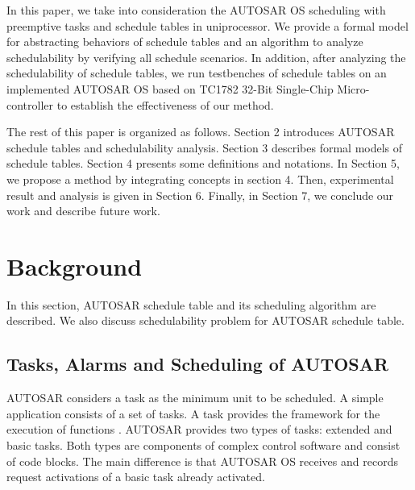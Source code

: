 \documentclass[10pt,conference]{IEEEtran}
\begin{document}
In this paper, we take into consideration the AUTOSAR OS scheduling with preemptive tasks and schedule tables in uniprocessor. We provide a formal model for abstracting behaviors of schedule tables and an algorithm to analyze schedulability by verifying all schedule scenarios. In addition, after analyzing the schedulability of schedule tables, we run testbenches of schedule tables on an implemented AUTOSAR OS based on TC1782 32-Bit Single-Chip Micro-controller \cite{infineon.org} to establish the effectiveness of our method.

The rest of this paper is organized as follows. Section 2 introduces AUTOSAR schedule tables and schedulability analysis. Section 3 describes formal models of schedule tables. Section 4 presents some definitions and notations. In Section 5, we propose a method by integrating concepts in section 4. Then, experimental result and analysis is given in Section 6. Finally, in Section 7, we conclude our work and describe future work.

\section{Background}
In this section, AUTOSAR schedule table and its scheduling algorithm are described. We also discuss schedulability problem for AUTOSAR schedule table.

\subsection{Tasks, Alarms and Scheduling of AUTOSAR}
AUTOSAR considers a task as the minimum unit to be scheduled. A simple application consists of a set of tasks. A task provides the framework for the execution of functions \cite{osek}. AUTOSAR provides two types of tasks: extended and basic tasks. Both types are components of complex control software and consist of code blocks. The main difference is that AUTOSAR OS receives and records request activations of a basic task already activated. 
\end{document}
